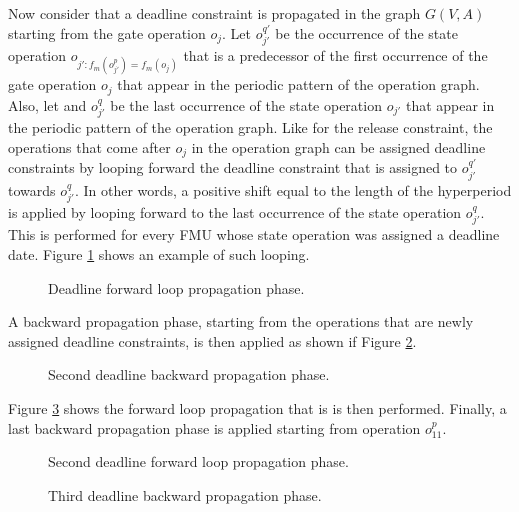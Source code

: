 Now consider that a deadline constraint is propagated in the graph $G(V,A)$ starting from the gate operation $o_j$. Let $o_{j'}^{q'}$ be the occurrence of the state operation $o_{j': f_m(o_{j'}^p) = f_m(o_j)}$ that is a predecessor of the first occurrence of the gate operation $o_j$ that appear in the periodic pattern of the operation graph. Also, let and $o_{j'}^q$ be the last occurrence of the state operation $o_{j'}$ that appear in the periodic pattern of the operation graph. Like for the release constraint, the operations that come after $o_j$ in the operation graph can be assigned deadline constraints by looping forward the deadline constraint that is assigned to $o_{j'}^{q'}$ towards $o_{j'}^q$. In other words, a positive shift equal to the length of the hyperperiod is applied by looping forward to the last occurrence of the state operation $o_{j'}^q$. This is performed for every FMU whose state operation was assigned a deadline date. Figure \ref{fig:dloop} shows an example of such looping. 

\begin{figure}[phbt]
\centering

\caption{Deadline forward loop propagation phase.}
\label{fig:dloop}
\end{figure}

A backward propagation phase, starting from the operations that are newly assigned deadline constraints, is then applied as shown if Figure \ref{fig:dpropagation2}. 

\begin{figure}[phbt]
\centering

\caption{Second deadline backward propagation phase.}
\label{fig:dpropagation2}
\end{figure}

Figure \ref{fig:dloop2} shows the forward loop propagation that is is then performed. Finally, a last backward propagation phase is applied starting from operation $o_{11}^p$.

\begin{figure}[phbt]
\centering

\caption{Second deadline forward loop propagation phase.}
\label{fig:dloop2}
\end{figure}

\begin{figure}[phbt]
\centering

\caption{Third deadline backward propagation phase.}
\label{fig:dpropagation3}
\end{figure} 

